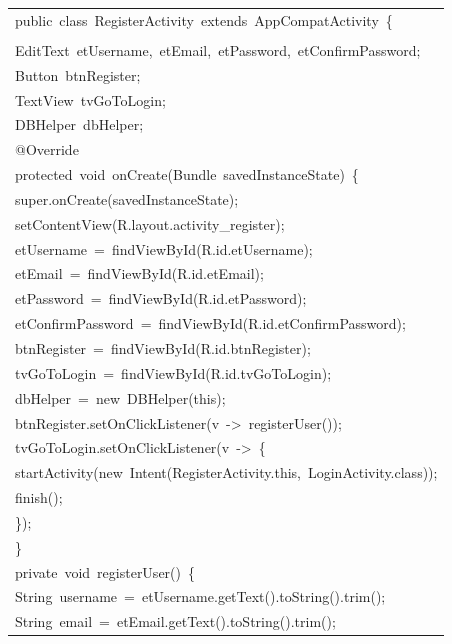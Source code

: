 \documentclass[a4paper,12pt]{article}
\begin{document}
\begin{longtable}{|p{}|}
{\ttfamily\small public\ class\ RegisterActivity\ extends\ AppCompatActivity\ \{} \\
\strut \\
{\ttfamily\small EditText\ etUsername,\ etEmail,\ etPassword,\ etConfirmPassword;} \\
{\ttfamily\small Button\ btnRegister;} \\
{\ttfamily\small TextView\ tvGoToLogin;} \\
{\ttfamily\small DBHelper\ dbHelper;} \\
{\ttfamily\small @Override} \\
{\ttfamily\small protected\ void\ onCreate(Bundle\ savedInstanceState)\ \{} \\
{\ttfamily\small super.onCreate(savedInstanceState);} \\
{\ttfamily\small setContentView(R.layout.activity\_register);} \\
{\ttfamily\small etUsername\ =\ findViewById(R.id.etUsername);} \\
{\ttfamily\small etEmail\ =\ findViewById(R.id.etEmail);} \\
{\ttfamily\small etPassword\ =\ findViewById(R.id.etPassword);} \\
{\ttfamily\small etConfirmPassword\ =\ findViewById(R.id.etConfirmPassword);} \\
{\ttfamily\small btnRegister\ =\ findViewById(R.id.btnRegister);} \\
{\ttfamily\small tvGoToLogin\ =\ findViewById(R.id.tvGoToLogin);} \\
{\ttfamily\small dbHelper\ =\ new\ DBHelper(this);} \\
{\ttfamily\small btnRegister.setOnClickListener(v\ -\textgreater{}\ registerUser());} \\
{\ttfamily\small tvGoToLogin.setOnClickListener(v\ -\textgreater{}\ \{} \\
{\ttfamily\small startActivity(new\ Intent(RegisterActivity.this,\ LoginActivity.class));} \\
{\ttfamily\small finish();} \\
{\ttfamily\small \});} \\
{\ttfamily\small \}} \\
{\ttfamily\small private\ void\ registerUser()\ \{} \\
{\ttfamily\small String\ username\ =\ etUsername.getText().toString().trim();} \\
{\ttfamily\small String\ email\ =\ etEmail.getText().toString().trim();} \\

\end{longtable}
\end{document}
